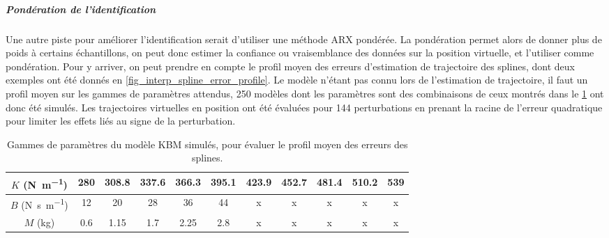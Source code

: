 
\subparagraph{Pondération de l'identification}

Une autre piste pour améliorer l'identification serait d'utiliser une méthode ARX pondérée. La pondération permet alors de donner plus de poids à certains échantillons, on peut donc estimer la confiance ou vraisemblance des données sur la position virtuelle, et l'utiliser comme pondération. Pour y arriver, on peut prendre en compte le profil moyen des erreurs d'estimation de trajectoire des splines, dont deux exemples ont été donnés en \cref{fig_interp_spline_error_profile}. Le modèle n'étant pas connu lors de l'estimation de trajectoire, il faut un profil moyen sur les gammes de paramètres attendus, 250 modèles dont les paramètres sont des combinaisons de ceux montrés dans le \cref{tab_impedance_model_param_list} ont donc été simulés. Les trajectoires virtuelles en position ont été évaluées pour 144 perturbations en prenant la racine de l'erreur quadratique pour limiter les effets liés au signe de la perturbation. 

\begin{table}[htbp] 
	\begin{center}
		\begin{tabular}{|c|c|c|c|c|c|c|c|c|c|c|}
			\hline  
			$K$ (\si{\newton\per\meter}) & 280 & 308.8 & 337.6 & 366.3 & 395.1 & 423.9 & 452.7 & 481.4 & 510.2 & 539 \\
			\hline
			$B$ (\si{\newton\second\per\meter}) & 12 & 20 & 28 & 36 & 44 & x & x & x & x & x \\
			\hline
			$M$ (\si{\kilogram}) & 0.6 & 1.15 & 1.7 & 2.25 & 2.8 & x & x & x & x & x \\
			\hline
		\end{tabular}
	\end{center}
	\caption[Gammes de paramètres du modèle KBM simulés]{Gammes de paramètres du modèle KBM simulés, pour évaluer le profil moyen des erreurs des splines.}
	\label{tab_impedance_model_param_list}	
\end{table}

